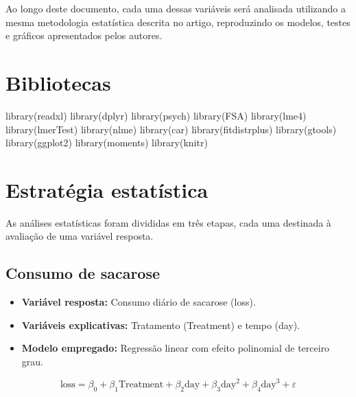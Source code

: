 \documentclass[
  brazilian,
  12pt,
  a4paper,
]{article}
\newenvironment{Shaded}{\begin{snugshade}}{\end{snugshade}}
\newcommand{\FunctionTok}[1]{\textcolor[rgb]{0.28,0.35,0.67}{#1}}
\newcommand{\NormalTok}[1]{\textcolor[rgb]{0.00,0.46,0.62}{#1}}
\begin{document}
Ao longo deste documento, cada uma dessas variáveis será analisada
utilizando a mesma metodologia estatística descrita no artigo,
reproduzindo os modelos, testes e gráficos apresentados pelos autores.

\section{Bibliotecas}\label{bibliotecas}

\begin{Shaded}
\begin{Highlighting}[]
\FunctionTok{library}\NormalTok{(readxl)}
\FunctionTok{library}\NormalTok{(dplyr)}
\FunctionTok{library}\NormalTok{(psych)}
\FunctionTok{library}\NormalTok{(FSA)}
\FunctionTok{library}\NormalTok{(lme4)}
\FunctionTok{library}\NormalTok{(lmerTest)}
\FunctionTok{library}\NormalTok{(nlme)}
\FunctionTok{library}\NormalTok{(car)}
\FunctionTok{library}\NormalTok{(fitdistrplus)}
\FunctionTok{library}\NormalTok{(gtools)}
\FunctionTok{library}\NormalTok{(ggplot2)}
\FunctionTok{library}\NormalTok{(moments)}
\FunctionTok{library}\NormalTok{(knitr)}
\end{Highlighting}
\end{Shaded}

\section{Estratégia estatística}\label{estratuxe9gia-estatuxedstica}

As análises estatísticas foram divididas em três etapas, cada uma
destinada à avaliação de uma variável resposta.

\subsection{Consumo de sacarose}\label{consumo-de-sacarose}

\begin{itemize}
\item
  \textbf{Variável resposta:} Consumo diário de sacarose (loss).
\item
  \textbf{Variáveis explicativas:} Tratamento (Treatment) e tempo (day).
\item
  \textbf{Modelo empregado:} Regressão linear com efeito polinomial de
  terceiro grau.
\end{itemize}

\[
\text{loss}=\beta_0+\beta_1\text{Treatment}+\beta_2\text{day}
+\beta_3\text{day}^2+\beta_4\text{day}^3+\varepsilon
\]
\end{document}
